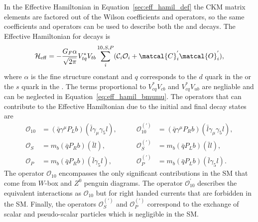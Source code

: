 {{%
In the Effective Hamiltonian in Equation~\ref{sec:eff_hamil_def} the CKM matrix elements are factored out of the Wilson coefficients and operators, so the same coefficients and operators can be used to describe both the \bd and \bs decays.
The Effective Hamiltonian for \bmumu decays is~\cite{DeBruyn:2012wk}
\begin{equation}
\mathcal{H}_{\mathrm{eff}} = -\frac{G_F \alpha}{\sqrt{2\pi}} V_{tq}^{*}V_{tb} \displaystyle\sum_{i}^{10,S,P} (\mathcal{C}_i\mathcal{O}_i + \matcal{C}^{'}_{i}\matcal{O}_{i}^{'}),
\label{eq:eff_hamil_bmumu}
\end{equation}
where $\alpha$ is the fine structure constant and $q$ corresponds to the $d$ quark in the \bd or the $s$ quark in the \bs. The terms proportional to $V^*_{cq}V_{cb}$ and $V^*_{cq}V_{ub}$ are negliable and can be neglected in Equation~\ref{eq:eff_hamil_bmumu}. The operators that can contribute to the \bmumu Effective Hamiltonian due to the initial and final decay states are
\begin{align}
 \mathcal{O}_{10}&=(\bar{q}\gamma^{\mu}P_{L}b)(\bar{l}\gamma_{\mu}\gamma_{5}l), &\qquad
 \mathcal{O}_{10}^{(')}&= (\bar{q}\gamma^{\mu}P_{R}b)(\bar{l}\gamma_{\mu}\gamma_{5}l), \\
 \mathcal{O}_{S}&= m_{b}(\bar{q}P_{R}b)(\bar{l}l),  &\qquad
\mathcal{O}_{S}^{(')}&= m_{b}(\bar{q}P_{L}b)(\bar{l}l), \\
 \mathcal{O}_{P}&= m_{b}(\bar{q}P_{R}b)(\bar{l}\gamma_{5}l), &\qquad
 \mathcal{O}_{P}^{(')}&= m_{b}(\bar{q}P_{L}b)(\bar{l}\gamma_{5}l).
\end{align}
The operator $\mathcal{O}_{10}$ encompasses the only significant contributions in the SM that come from $W$-box and $Z^0$ penguin diagrams. The operator $\mathcal{O}_{10}^'$ describes the equivalent interactions as $\mathcal{O}_{10}$ but for right handed currents that are forbidden in the SM. %
 Finally, the operators $\mathcal{O}_{S}^{(')}$ and $\mathcal{O}_{P}^{(')}$ correspond to the exchange of scalar and pseudo-scalar particles which is negligible in the SM. 

}}
